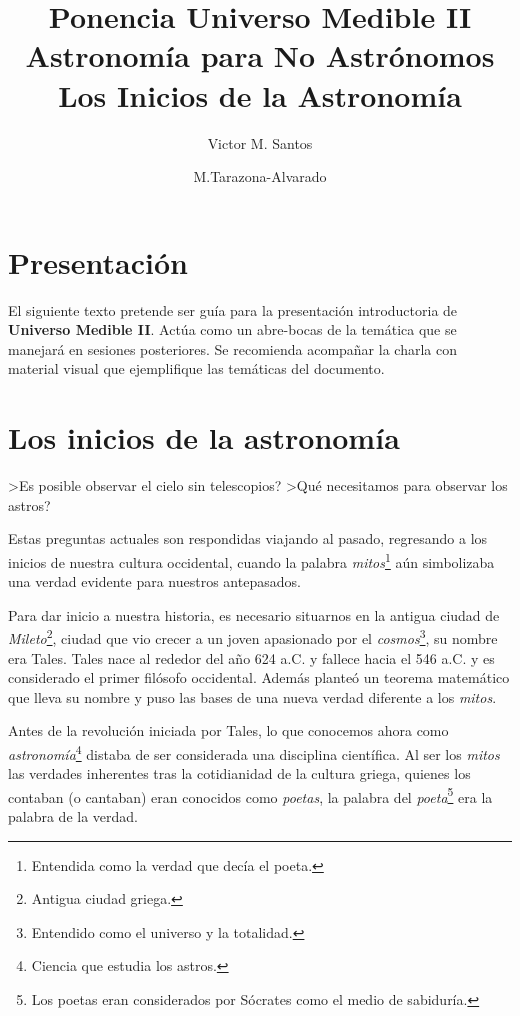 \documentclass[12pt,a4paper]{article}
\author{Victor M. Santos \and M.Tarazona-Alvarado}
\title{\textbf{Ponencia Universo Medible II }\\ Astronom\'ia para No Astr\'onomos \\ Los Inicios de la Astronom\'ia}
\begin{document}
\maketitle


\section*{Presentaci\'on}

El siguiente texto pretende ser gu\'ia para la presentaci\'on introductoria de \textbf{Universo Medible II}. Act\'ua como un abre-bocas de la tem\'atica que se manejar\'a en sesiones posteriores. Se recomienda acompa\~nar la charla con material visual que ejemplifique las tem\'aticas del documento.

\section*{Los inicios de la astronom\'ia}  

>Es posible observar el cielo sin telescopios? >Qu\'e necesitamos para observar los astros?

\medskip 

Estas preguntas actuales son respondidas viajando al pasado, regresando a los inicios de nuestra cultura occidental, cuando la palabra \textit{mitos}\footnote{Entendida como la verdad que dec\'ia el poeta.} a\'un simbolizaba una verdad evidente para nuestros antepasados.

\medskip 

Para dar inicio a nuestra historia, es necesario situarnos en la antigua ciudad de \textit{Mileto}\footnote{Antigua ciudad griega.}, ciudad que vio crecer a un joven apasionado por el \textit{cosmos}\footnote{Entendido como el universo y la totalidad.}, su nombre era Tales. Tales nace al rededor del a\~no 624 a.C. y fallece hacia el 546 a.C. y es considerado el primer fil\'osofo occidental. Adem\'as plante\'o un teorema matem\'atico que lleva su nombre y puso las bases de una nueva verdad diferente a los \textit{mitos}.

\medskip 

Antes de la revoluci\'on iniciada por Tales, lo que conocemos ahora como \textit{astronom\'ia}\footnote{Ciencia que estudia los astros.} distaba de ser considerada una disciplina cient\'ifica. Al ser los \textit{mitos} las verdades inherentes tras la cotidianidad de la cultura griega, quienes los contaban (o cantaban) eran conocidos como \textit{poetas}, la palabra del \textit{poeta}\footnote{Los poetas eran considerados por S\'ocrates como el medio de sabidur\'ia.} era la palabra de la verdad.
\end{document}
